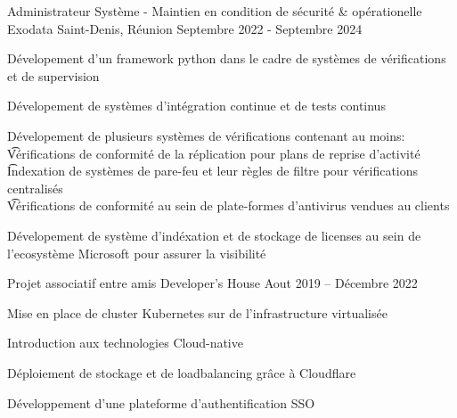 
\begin{cventries}
  \cventry
    {Administrateur Système - Maintien en condition de sécurité \& opérationelle}
    {Exodata}
    {Saint-Denis, Réunion}
    {Septembre 2022 - Septembre 2024}
    {
      \begin{cvitems}
       \item{Dévelopement d'un framework python dans le cadre de systèmes de vérifications et de supervision}
       \item{Dévelopement de systèmes d'intégration continue et de tests continus}
       \item{
        Dévelopement de plusieurs systèmes de vérifications contenant au moins: \\
        \t  * Vérifications de conformité de la réplication pour plans de reprise d'activité \\
        \t  * Indexation de systèmes de pare-feu et leur règles de filtre pour vérifications centralisés \\
        \t  * Vérifications de conformité au sein de plate-formes d'antivirus vendues au clients
        }
        \item{Dévelopement de système d'indéxation et de stockage de licenses au sein de l'ecosystème Microsoft pour assurer la visibilité}
      \end{cvitems}
    }
  \cventry
    {Projet associatif entre amis}
    {Developer's House}
    {}
    {Aout 2019 -- Décembre 2022}
    {
    \begin{cvitems}
      \item{Mise en place de cluster Kubernetes sur de l'infrastructure virtualisée}
      \item{Introduction aux technologies Cloud-native}
      \item{Déploiement de stockage et de loadbalancing grâce à Cloudflare}
      \item{Développement d'une plateforme d'authentification SSO}
    \end{cvitems}
    }
    
\end{cventries}
